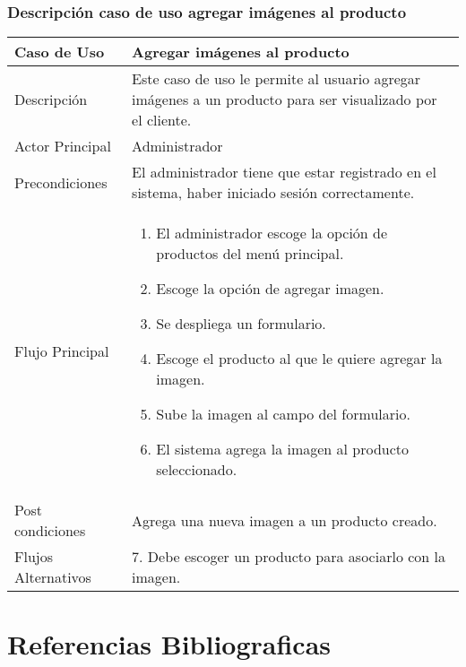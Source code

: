 \documentclass[12pt,a4paper]{article}
\newcommand{\newsection}[1]{\section{\hspace{4mm} #1}}%
\begin{document}
\subsubsection*{Descripción caso de uso agregar imágenes al producto}
\begin{table}[h]
        \centering
        \begin{tabular}{| p{3cm}| p{11cm} |} 
        \hline  
        Caso de Uso         &    \textbf{Agregar imágenes al producto }   \\ 
        \hline
        Descripción         &   Este caso de uso le permite al usuario agregar imágenes a un producto para ser visualizado por el cliente.    \\ 
        \hline
        Actor Principal     &     Administrador \\ 
        \hline
        Precondiciones      &  El administrador tiene que estar registrado en el sistema, haber iniciado sesión correctamente.   	\\
        \hline
        Flujo Principal     &    

            \begin{enumerate}
                \item El administrador escoge la opción de productos del menú principal.
                \item Escoge la opción de agregar imagen.
                \item Se despliega un formulario.
                \item Escoge el producto al que le quiere agregar la imagen.
                \item Sube la imagen al campo del formulario.
                \item El sistema agrega la imagen al producto seleccionado.
            \end{enumerate}
        \\  
        \hline
        Post condiciones    &   Agrega una nueva imagen a un producto creado.    \\  
        \hline
        Flujos Alternativos &    7. Debe escoger un producto para asociarlo con la imagen.   \\  
        \hline
        \end{tabular}
    \end{table}


%
%



\newpage

%
\newsection{Referencias Bibliograficas}


\end{document}
